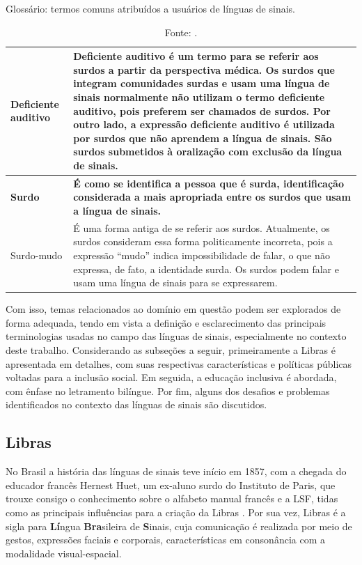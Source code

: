 \begin{table}[htbp]
\caption{Glossário: termos comuns atribuídos a usuários de línguas de sinais.}
\label{tab:glossario:termos-usuarios}
\begin{tabularx}{\textwidth}{l|X} \hline
Deficiente auditivo & Deficiente auditivo é um termo para se referir aos surdos a partir da perspectiva médica. Os surdos que integram comunidades surdas e usam uma língua de sinais normalmente não utilizam o termo deficiente auditivo, pois preferem ser chamados de surdos. Por outro lado, a expressão deficiente auditivo é utilizada por surdos que não aprendem a língua de sinais. São surdos submetidos à oralização com exclusão da língua de sinais. \\ \hline
\textbf{Surdo} & \textbf{É como se identifica a pessoa que é surda, identificação considerada a mais apropriada entre os surdos que usam a língua de sinais.} \\ \hline
Surdo-mudo & É uma forma antiga de se referir aos surdos. Atualmente, os surdos consideram essa forma politicamente incorreta, pois a expressão ``mudo'' indica impossibilidade de falar, o que não expressa, de fato, a identidade surda. Os surdos podem falar e usam uma língua de sinais para se expressarem. \\ \hline
\end{tabularx}
\caption*{Fonte: .}
\end{table}

Com isso, temas relacionados ao domínio em questão podem ser explorados de forma adequada, tendo em vista a definição e esclarecimento das principais terminologias usadas no campo das línguas de sinais, especialmente no contexto deste trabalho. Considerando as subseções a seguir, primeiramente a Libras é apresentada em detalhes, com suas respectivas características e políticas públicas voltadas para a inclusão social. Em seguida, a educação inclusiva é abordada, com ênfase no letramento bilíngue. Por fim, alguns dos desafios e problemas identificados no contexto das línguas de sinais são discutidos.

\subsection{Libras}
\label{fundamentacao-teorica:linguas-sinais:libras}

No Brasil a história das línguas de sinais teve início em 1857, com a chegada do educador francês Hernest Huet, um ex-aluno surdo do Instituto de Paris, que trouxe consigo o conhecimento sobre o alfabeto manual francês e a LSF, tidas como as principais influências para a criação da Libras \cite{Honora2017,Almeida2015}. Por sua vez, Libras é a sigla para \textbf{Lí}ngua \textbf{Bra}sileira de \textbf{S}inais, cuja comunicação é realizada por meio de gestos, expressões faciais e corporais, características em consonância com a modalidade visual-espacial.

